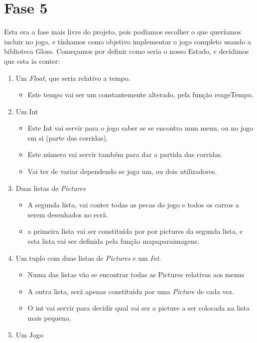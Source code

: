 \documentclass[a4paper]{report} %
\begin{document}
\section{Fase 5}
    Esta era a fase mais livre do projeto, pois podíamos escolher o que queríamos incluir no jogo, e tínhamos como objetivo implementar o jogo completo usando a biblioteca Gloss. 
    Começamos por definir como seria o nosso Estado, e decidimos que esta ia conter:
    \begin{enumerate}
   \item Um \textit{Float}, que seria relativo a tempo.
   \begin{itemize}
     \item Este tempo vai ser um constantemente alterado, pela função reageTempo.
   \end{itemize}
   \item Um Int
   \begin{itemize}
     \item Este Int vai servir para o jogo saber se se encontra num menu, ou no jogo em si (parte das corridas).
     \item Este número vai servir também para dar a partida das corridas.
     \item Vai ter de variar dependendo se joga um, ou dois utilizadores.
   \end{itemize}
   \item Duas listas de \textit{Pictures}
   \begin{itemize}
     \item A segunda lista, vai conter todas as pecas do jogo e todos os carros a serem desenhados no ecrã.
     \item a primeira lista vai ser constituída por por pictures da segunda lista, e esta lista vai ser definida pela função mapaparaimagens.
   \end{itemize}
   \item Um tuplo com duas listas de \textit{Pictures} e um \textit{Int}.
   \begin{itemize}
     \item Numa das listas vão se encontrar todas as Pictures relativas aos menus
     \item A outra lista, será apenas constituida por uma \textit{Picture} de cada vez. 
     \item O int vai servir para decidir qual vai ser a picture a ser colocada na lista mais pequena.
   \end{itemize}
   \item Um Jogo
   \begin{itemize}

\end{itemize}
\end{enumerate}
\end{document}
